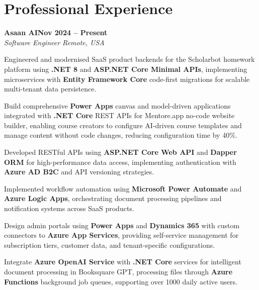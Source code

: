 \documentclass[letterpaper,10pt]{article}
\newcommand{\headingBf}[2]{
  \hspace{10pt}\textbf{#1}\hfill\textbf{#2}\\
}
\newcommand{\headingIt}[2]{
  \hspace{10pt}\textit{#1}\hfill\textit{#2}\\
}
\newenvironment{resume_list}{
  \vspace{-7pt}
  \begin{itemize}[itemsep=-2px, parsep=1pt, leftmargin=30pt]
}{
  \end{itemize}
}
\begin{document}
\section{Professional Experience}

\headingBf{Asaan AI}{Nov 2024 -- Present}
\headingIt{Software Engineer \hfill Remote, USA}{}
\begin{resume_list}
    \item Engineered and modernised SaaS product backends for the Scholarbot homework platform using \textbf{.NET 8} and \textbf{ASP.NET Core Minimal APIs}, implementing microservices with \textbf{Entity Framework Core} code-first migrations for scalable multi-tenant data persistence.
    \item Build comprehensive \textbf{Power Apps} canvas and model-driven applications integrated with \textbf{.NET Core} REST APIs for Mentore.app no-code website builder, enabling course creators to configure AI-driven course templates and manage content without code changes, reducing configuration time by 40\%.
    \item Developed RESTful APIs using \textbf{ASP.NET Core Web API} and \textbf{Dapper ORM} for high-performance data access, implementing authentication with \textbf{Azure AD B2C} and API versioning strategies.
    \item Implemented workflow automation using \textbf{Microsoft Power Automate} and \textbf{Azure Logic Apps}, orchestrating document processing pipelines and notification systems across SaaS products.
    \item Design admin portals using \textbf{Power Apps} and \textbf{Dynamics 365} with custom connectors to \textbf{Azure App Services}, providing self-service management for subscription tiers, customer data, and tenant-specific configurations.
    \item Integrate \textbf{Azure OpenAI Service} with \textbf{.NET Core} services for intelligent document processing in Booksquare GPT, processing files through \textbf{Azure Functions} background job queues, supporting over 1000 daily active users.
\end{resume_list}
\end{document}

